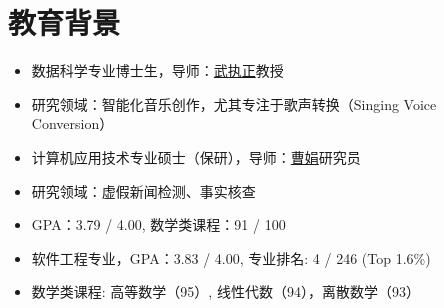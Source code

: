 \documentclass{resume}
\begin{document}





\section{教育背景}
{
  \small 
\begin{itemize}
  \item 数据科学专业博士生，导师：\href{https://scholar.google.com/citations?user=K6zhweAAAAAJ&hl=en}{武执正}教授 
  \item 研究领域：智能化音乐创作，尤其专注于歌声转换（Singing Voice Conversion）
\end{itemize}
}

{
  \small 
\begin{itemize}
  \item 计算机应用技术专业硕士（保研），导师：\href{https://scholar.google.com/citations?user=fSBdNg0AAAAJ&hl=zh-CN}{曹娟}研究员
  \item 研究领域：虚假新闻检测、事实核查
  \item GPA：3.79 / 4.00, 数学类课程：91 / 100
\end{itemize}
}

{
  \small 
\begin{itemize}
  \item 软件工程专业，GPA：3.83 / 4.00, 专业排名: 4 / 246 (Top 1.6\%)
  \item 数学类课程: 高等数学（95）, 线性代数（94），离散数学（93）
\end{itemize}
}
\end{document}
